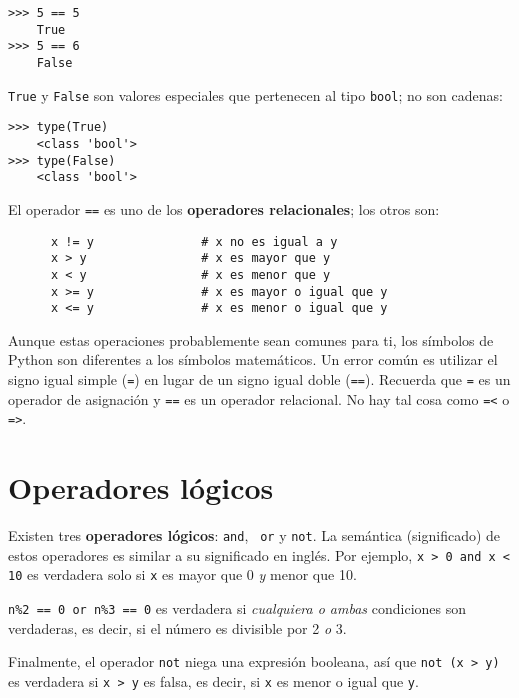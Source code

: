 \documentclass[10pt]{book}
\begin{document}
\begin{verbatim}
>>> 5 == 5
    True
>>> 5 == 6
    False
\end{verbatim}
%
{\tt True} y {\tt False} son valores
especiales que pertenecen al tipo {\tt bool}; no son cadenas:

\begin{verbatim}
>>> type(True)
    <class 'bool'>
>>> type(False)
    <class 'bool'>
\end{verbatim}
%
El operador {\tt ==} es uno de los {\bf operadores relacionales}; los
otros son:

\begin{verbatim}
      x != y               # x no es igual a y
      x > y                # x es mayor que y
      x < y                # x es menor que y
      x >= y               # x es mayor o igual que y
      x <= y               # x es menor o igual que y
\end{verbatim}
%
Aunque estas operaciones probablemente sean comunes para ti, los símbolos de Python
son diferentes a los símbolos matemáticos.  Un error común
es utilizar el signo igual simple ({\tt =}) en lugar de un signo igual doble
({\tt ==}).  Recuerda que {\tt =} es un operador de asignación y
{\tt ==} es un operador relacional.   No hay tal cosa como
{\tt =<} o {\tt =>}.


\section {Operadores lógicos}

Existen tres {\bf operadores lógicos}: {\tt and}, {\tt
or} y {\tt not}.  La semántica (significado) de estos operadores es
similar a su significado en inglés.  Por ejemplo,
{\tt x > 0 and x < 10} es verdadera solo si {\tt x} es mayor que 0
{\em y} menor que 10.

{\tt n\%2 == 0 or n\%3 == 0} es verdadera si {\em cualquiera o ambas}
condiciones son verdaderas, es decir, si el número es divisible por 2 {\em o}
3.

Finalmente, el operador {\tt not} niega una expresión
booleana, así que {\tt not (x > y)} es verdadera si {\tt x > y} es falsa,
es decir, si {\tt x} es menor o igual que {\tt y}.
\end{document}
